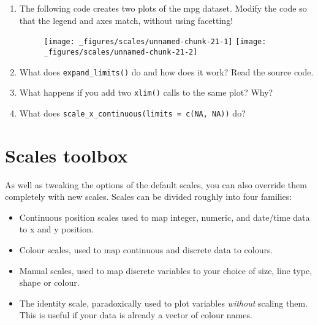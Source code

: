\begin{enumerate}
\def\labelenumi{\arabic{enumi}.}
\item
  The following code creates two plots of the mpg dataset. Modify the
  code so that the legend and axes match, without using facetting!

\begin{Shaded}
\begin{Highlighting}[]
\StringTok{ }\OperatorTok{==}\NormalTok{)}
\StringTok{ }\OperatorTok{==}\NormalTok{)}

\OperatorTok{+}\StringTok{ }\NormalTok{()}
\OperatorTok{+}\StringTok{ }\NormalTok{()}
\end{Highlighting}
\end{Shaded}

  \begin{figure}[H]
    \texttt{[image: \_figures/scales/unnamed-chunk-21-1]}%
    \texttt{[image: \_figures/scales/unnamed-chunk-21-2]}
  \end{figure}
\item
  What does \texttt{expand\_limits()} do and how does it work? Read the
  source code.
\item
  What happens if you add two \texttt{xlim()} calls to the same plot?
  Why?
\item
  What does \texttt{scale\_x\_continuous(limits\ =\ c(NA,\ NA))} do?
\end{enumerate}

\hypertarget{sec:scale-details}{%
\section{Scales toolbox}\label{sec:scale-details}}

As well as tweaking the options of the default scales, you can also
override them completely with new scales. Scales can be divided roughly
into four families:

\begin{itemize}
\item
  Continuous position scales used to map integer, numeric, and date/time
  data to x and y position.
\item
  Colour scales, used to map continuous and discrete data to colours.
\item
  Manual scales, used to map discrete variables to your choice of size,
  line type, shape or colour.
\item
  The identity scale, paradoxically used to plot variables
  \emph{without} scaling them. This is useful if your data is already a
  vector of colour names.
\end{itemize}

